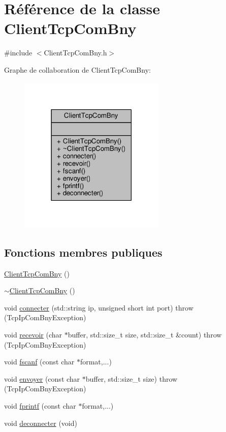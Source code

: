 \hypertarget{classClientTcpComBny}{}\section{Référence de la classe Client\+Tcp\+Com\+Bny}
\label{classClientTcpComBny}


{\ttfamily \#include $<$Client\+Tcp\+Com\+Bny.\+h$>$}



Graphe de collaboration de Client\+Tcp\+Com\+Bny\+:\nopagebreak
\begin{figure}[H]
\begin{center}
\leavevmode
\includegraphics[width=198pt]{classClientTcpComBny__coll__graph}
\end{center}
\end{figure}
\subsection*{Fonctions membres publiques}
\begin{DoxyCompactItemize}
\item 
\hyperlink{classClientTcpComBny_a4e87071b400a5129f642a5a3721d420f}{Client\+Tcp\+Com\+Bny} ()
\item 
\hyperlink{classClientTcpComBny_ade30f75875dc873e2dc522228a7e5c68}{$\sim$\+Client\+Tcp\+Com\+Bny} ()
\item 
void \hyperlink{classClientTcpComBny_ac105b046c2e544b1a433f99d83d7447a}{connecter} (std\+::string ip, unsigned short int port)  throw (\+Tcp\+Ip\+Com\+Bny\+Exception)
\item 
void \hyperlink{classClientTcpComBny_ad32e6a288aeff3d243d88c60afe967c3}{recevoir} (char $\ast$buffer, std\+::size\+\_\+t size, std\+::size\+\_\+t \&count)  throw (\+Tcp\+Ip\+Com\+Bny\+Exception)
\item 
void \hyperlink{classClientTcpComBny_a0745845f86951740b6839812410608e8}{fscanf} (const char $\ast$format,...)
\item 
void \hyperlink{classClientTcpComBny_acf5ac7ad2c6815e6797a95f50906172f}{envoyer} (const char $\ast$buffer, std\+::size\+\_\+t size)  throw (\+Tcp\+Ip\+Com\+Bny\+Exception)
\item 
void \hyperlink{classClientTcpComBny_a3f2db7ecde5bf993a96bae8f4107e1c8}{fprintf} (const char $\ast$format,...)
\item 
void \hyperlink{classClientTcpComBny_aec1398f686da1f83884fd98924cc0725}{deconnecter} (void)
\end{DoxyCompactItemize}


